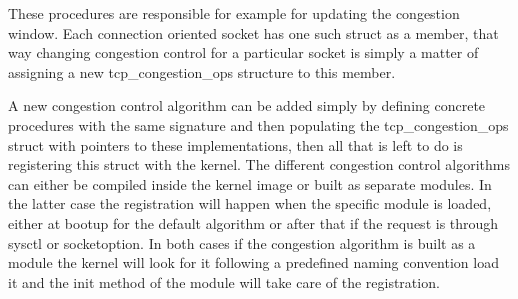 \documentclass[type=bsc,accentcolor=tud9a,colorback,11pt,paper=a4report]{tudthesis}
\begin{document}
These procedures are 
responsible for example for updating the congestion window. Each connection 
oriented socket has one such struct as a member, that way changing congestion
control for a particular socket is simply a matter of assigning a new 
tcp\_congestion\_ops structure to this member.

A new congestion control algorithm can be added simply by defining concrete 
procedures with the same signature and then populating the tcp\_congestion\_ops 
struct with pointers to these implementations, then all that is left to do is 
registering this struct with the kernel. 
The different congestion control algorithms can either be compiled inside the
kernel image or built as separate modules. In the latter case the registration 
will happen when the specific module is loaded, either at bootup for the default
algorithm or after that if the request is through sysctl or socketoption. 
In both cases if the congestion algorithm is built as a module the kernel will 
look for it following a predefined naming convention load it and the init method
of the module will take care of the registration.
\end{document}
